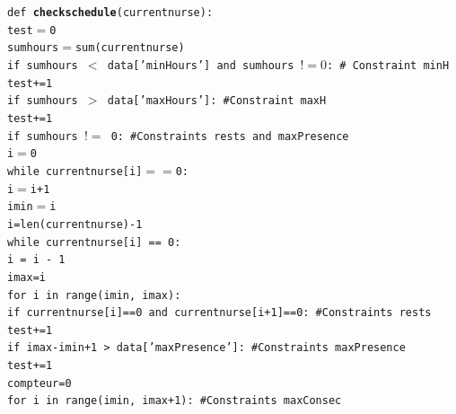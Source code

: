 \documentclass[11pt]{article}
\begin{document}
{\begin{appendix}
\noindent
{\tt def {\bf checkschedule}(currentnurse):\\
    test$=$0\\
    sumhours$=$sum(currentnurse)\\
    if sumhours $<$ data['minHours'] and sumhours $!=0$: \# Constraint minH\\
  \hspace*{1cm}       test+=1\\
    if sumhours $>$ data['maxHours']:   \#Constraint maxH\\
 \hspace*{1cm}        test+=1\\
    if sumhours $!=$ 0:        \#Constraints rests and maxPresence\\
 \hspace*{1cm}        i$=$0\\
 \hspace*{1cm}        while currentnurse[i]$==$0:\\
 \hspace*{1.5cm}            i$=$i+1\\
\hspace*{1cm}         imin$=$i\\
 \hspace*{1cm}        i=len(currentnurse)-1\\
 \hspace*{1cm}        while currentnurse[i] == 0:\\
\hspace*{1.5cm}             i = i - 1\\
\hspace*{1cm}         imax=i \\
\hspace*{1cm}         for i in range(imin, imax):\\
 \hspace*{1.5cm}            if currentnurse[i]==0 and currentnurse[i+1]==0:   \#Constraints rests\\
 \hspace*{2cm}                test+=1\\
\hspace*{1cm}         if imax-imin+1 > data['maxPresence']:       \#Constraints maxPresence\\
\hspace*{1.5cm}             test+=1\\
\hspace*{1cm}         compteur=0\\
 \hspace*{1cm}        for i in range(imin, imax+1):               \#Constraints maxConsec\\
}
\end{appendix}}
\end{document}
